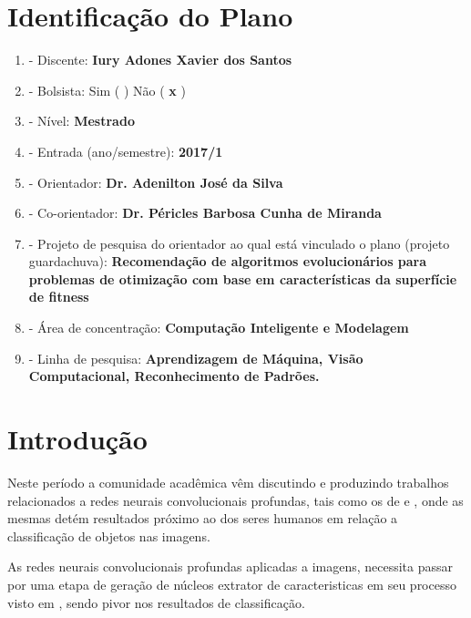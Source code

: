 \documentclass[12pt,a4paper,oneside]{book}
\newcommand\wb[1]{\discretionary{#1}{#1}{#1}}
\begin{document}

\thispagestyle{empty}
\frontmatter
\tableofcontents
\pagebreak
\chapter*{Identifica\c{c}\~{a}o do Plano}
\renewcommand{\labelenumi}{\alph{enumi}}
\begin{enumerate}
    \item - Discente: \textbf{Iury Adones Xavier dos Santos}
    \item - Bolsista: Sim ( )  N\~{a}o ( \textbf{x} )
    \item - N\'{i}vel: \textbf{Mestrado}
    \item - Entrada (ano/semestre): \textbf{2017/1}
    \item - Orientador: \textbf{Dr. Adenilton Jos\'{e} da Silva}
    \item - Co-orientador: \textbf{Dr. P\'{e}ricles Barbosa Cunha de Miranda}
    \item - Projeto de pesquisa do orientador ao qual est\'{a} vinculado o plano
        (projeto guarda\wb-chuva): \textbf{Recomenda\c{c}\~{a}o de algoritmos
        evolucion\'{a}rios para problemas de otimiza\c{c}\~{a}o com base em
        caracter\'{i}sticas da superf\'{i}cie de fitness}
    \item - \'{A}rea de concentra\c{c}\~{a}o: \textbf{Computa\c{c}\~{a}o
        Inteligente e Modelagem}
    \item - Linha de pesquisa: \textbf{Aprendizagem de M\'{a}quina, Vis\~{a}o
        Computacional, Reconhecimento de Padr\~{o}es.}
\end{enumerate}
\renewcommand{\labelenumi}{\arabic{enumi}}
\pagebreak
\mainmatter
\chapter{Introdu\c{c}\~{a}o}
Neste per\'{i}odo a comunidade acad\^{e}mica v\^{e}m discutindo e produzindo
trabalhos relacionados a redes neurais convolucionais profundas, tais como os de
\autocite{JADERBERG2014} e \autocite{ANIL2015}, onde as mesmas det\'{e}m
resultados pr\'{o}ximo ao dos seres humanos em rela\c{c}\~ao a
classifica\c{c}\~ao de objetos nas imagens.

As redes neurais convolucionais profundas aplicadas a imagens, necessita passar
por uma etapa de gera\c{c}\~{a}o de n\'{u}cleos extrator de caracteristicas em
seu processo visto em \autocite{GOODFELLOW2013}, sendo pivor nos resultados de
classifica\c{c}\~{a}o.
\end{document}

